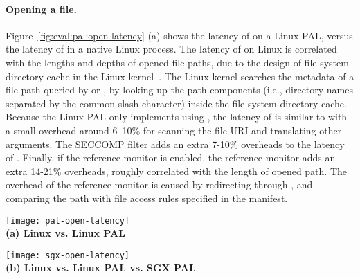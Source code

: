 \paragraph{Opening a file.}
Figure~\ref{fig:eval:pal:open-latency} (a) shows the latency of  on a Linux PAL, versus the latency of  \linuxapis{} in a native Linux process.
The latency of  \linuxapis{} on Linux is correlated with
the lengths and depths of opened file paths,
due to the design of file system directory cache
in the Linux kernel~\cite{tsai15dcache}.
The Linux kernel searches the metadata of a file path queried by  or , by looking up the path components (i.e., directory names separated by the common slash character)
inside the file system directory cache.
Because the Linux PAL only implements  using , the latency of  is similar to  with a small overhead around 6--10\% for
scanning the file URI and translating other \linuxapi{} arguments.
The SECCOMP filter adds an extra 7-10\% overheads to the latency of . Finally, if the reference monitor is enabled, the reference monitor adds an extra 14-21\% overheads, roughly correlated with the length of opened path.
The overhead of the reference monitor
is caused by redirecting  \linuxapis{} through , and comparing the path with file access rules specified in the manifest.  




\begin{figure*}[t!]
\centering
\footnotesize
\begin{minipage}{.49\linewidth}
\centering
\texttt{[image: pal-open-latency]}\\
{\bf (a) Linux vs. Linux PAL}
\vspace{6pt}
\end{minipage}
\begin{minipage}{.49\linewidth}
\centering
\texttt{[image: sgx-open-latency]}\\
{\bf (b) Linux vs. Linux PAL vs. SGX PAL}
\vspace{6pt}
\end{minipage}
\caption{Latency of  on Linux and SGX, and  \linuxapis{} in a native Linux process. Figure (a) shows the comparison between  \linuxapis{} and  on a Linux PAL,
with the options of enabling the SECCOMP filter ({\bf +SC})
and reference monitor ({\bf +RM}). Figure(b) shows the comparison between   \linuxapis{},  on a Linux PAL,
and  inside an SGX enclave, either with or without
integrity protection ({\bf +Shield}).}
\label{fig:eval:pal:open-latency}
\end{figure*}


